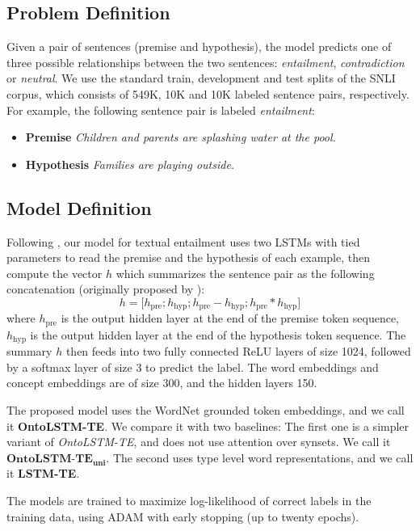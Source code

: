 \subsection{Problem Definition}
Given a pair of sentences (premise and hypothesis), the model predicts one of 
three possible relationships between the two sentences: \textit{entailment}, 
\textit{contradiction} or \textit{neutral}.
We use the standard train, development and test splits of the SNLI corpus, which 
consists of 549K, 10K and 10K labeled sentence pairs, respectively.
For example, the following sentence pair is labeled \textit{entailment}:
 \begin{itemize}
  \item \textbf{Premise} \textit{Children and parents are splashing water at the 
pool.}
  \item \textbf{Hypothesis} \textit{Families are playing outside.}
 \end{itemize}
 
\subsection{Model Definition}
Following \cite{bowman2016fast}, our model for textual entailment uses two LSTMs with tied parameters
to  read the premise and the hypothesis of each example, then compute the vector $h$ 
which summarizes the sentence pair as the following concatenation (originally proposed by \cite{mou2015recognizing}):
$$h=\big[h_{\text{pre}}; h_{\text{hyp}}; h_{\text{pre}} 
-h_{\text{hyp}};h_{\text{pre}} *h_{\text{hyp}}\big]$$
where $h_\text{pre}$ is the output hidden layer at the end of the premise token 
sequence, $h_\text{hyp}$ is the output hidden layer at the end of the hypothesis 
token sequence.
The summary $h$ then feeds into two fully connected ReLU layers of size 1024, 
followed by a softmax layer of size 3 to predict the label.
The word embeddings and concept embeddings are of size 300, and the hidden 
layers 150.

The proposed model uses the WordNet grounded token embeddings, and we call it \textbf{OntoLSTM-TE}.
We compare it with two baselines: The first one is a simpler variant of \textit{OntoLSTM-TE}, and does not
use attention over synsets. We call it $\textbf{OntoLSTM-TE}_{\textbf{uni}}$. The second uses type level word representations, and 
we call it \textbf{LSTM-TE}.

The models are trained to maximize log-likelihood of correct labels in the 
training data, using ADAM \citep{kingma2014adam} with early stopping (up to 
twenty epochs).


